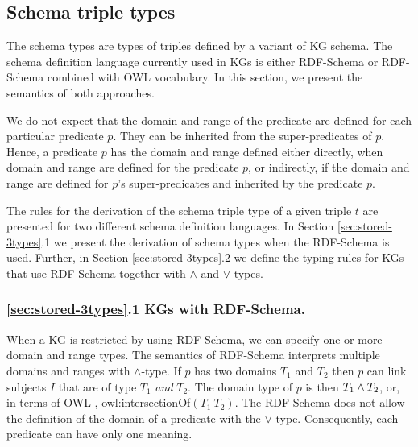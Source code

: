 \documentclass[runningheads]{llncs}
\newcommand{\memo}[1]{}
\begin{document}
\memo{Moreover, the types $T$ that are derived by the above rule are
  minimal in the sense that given the information provided, i.e., the
  types of $t$'s components, their interpretations are minimal
  possible comparing them to the interpretations of all other derived
  types of $t$.}






\subsection{Schema triple types\label{sec:stored-3types}}

The schema types are types of triples defined by a variant of KG
schema. The schema definition language currently used in KGs is either
RDF-Schema \cite{rdfschema} or RDF-Schema combined with OWL
\cite{owl2} vocabulary. In this section, we present the semantics of
both approaches.

We do not expect that the domain and range of the predicate are defined
for each particular predicate $p$. They can be inherited from the
super-predicates of $p$. Hence, a predicate $p$ has the domain and
range defined either directly, when domain and range are defined for
the predicate $p$, or indirectly, if the domain and range are defined
for $p$'s super-predicates and inherited by the predicate $p$.

The rules for the derivation of the schema triple type of a given
triple $t$ are presented for two different schema definition
languages. In Section \ref{sec:stored-3types}.1 we present the
derivation of schema types when the RDF-Schema is used. Further, in
Section \ref{sec:stored-3types}.2 we define the typing rules for
KGs that use RDF-Schema together with $\land$ and $\lor$ types.






\subsubsection{\ref{sec:stored-3types}.1 KGs with RDF-Schema.}
When a KG is restricted by using RDF-Schema, we can specify one or more
domain and range types. The semantics of RDF-Schema
\cite{rdfsemantics} interprets multiple domains and ranges with
$\land$-type. If $p$ has two domains $T_1$ and $T_2$ then $p$ can link
subjects $I$ that are of type $T_1$ \emph{and} $T_2$. The domain type
of $p$ is then $T_1\land\/T_2$, or, in terms of OWL \cite{owl},
owl:intersectionOf$(T_1\ T_2)$. The RDF-Schema does not allow the
definition of the domain of a predicate with the
$\lor$-type. Consequently, each predicate can have only one meaning.
\end{document}
